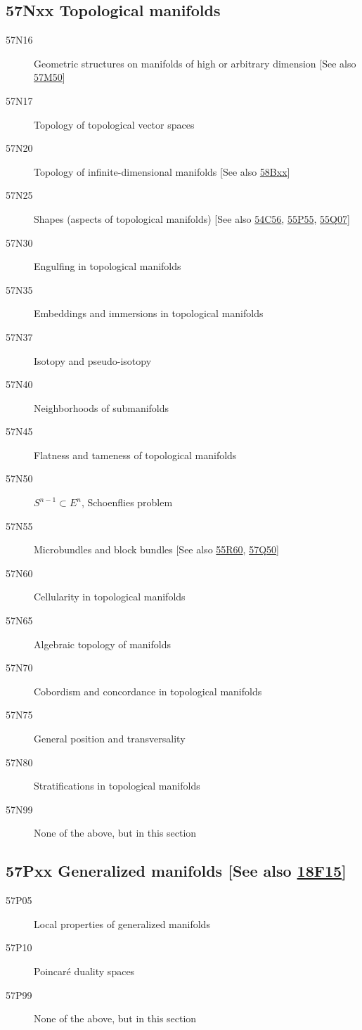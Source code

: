 \documentclass[letterpaper]{article}
\begin{document}
\subsection*{57Nxx  Topological manifolds }\label{57Nxx}
\begin{description} 
\item [57N16]\label{57N16} Geometric structures on manifolds of high or arbitrary dimension [See also \hyperref[57M50]{57M50}]
\item [57N17]\label{57N17} Topology of topological vector spaces
\item [57N20]\label{57N20} Topology of infinite-dimensional manifolds [See also \hyperref[58Bxx]{58Bxx}]
\item [57N25]\label{57N25} Shapes (aspects of topological manifolds) [See also \hyperref[54C56]{54C56}, \hyperref[55P55]{55P55}, \hyperref[55Q07]{55Q07}]
\item [57N30]\label{57N30} Engulfing in topological manifolds
\item [57N35]\label{57N35} Embeddings and immersions in topological manifolds
\item [57N37]\label{57N37} Isotopy and pseudo-isotopy
\item [57N40]\label{57N40} Neighborhoods of submanifolds
\item [57N45]\label{57N45} Flatness and tameness of topological manifolds
\item [57N50]\label{57N50} $S^{n-1}\subset E^n$, Schoenflies problem
\item [57N55]\label{57N55} Microbundles and block bundles [See also \hyperref[55R60]{55R60}, \hyperref[57Q50]{57Q50}]
\item [57N60]\label{57N60} Cellularity in topological manifolds
\item [57N65]\label{57N65} Algebraic topology of manifolds
\item [57N70]\label{57N70} Cobordism and concordance in topological manifolds
\item [57N75]\label{57N75} General position and transversality
\item [57N80]\label{57N80} Stratifications in topological manifolds
\item [57N99]\label{57N99} None of the above, but in this section
\end{description}
\subsection*{57Pxx  Generalized manifolds [See also \hyperref[18F15]{18F15}] }\label{57Pxx}
\begin{description}  
\item [57P05]\label{57P05} Local properties of generalized manifolds
\item [57P10]\label{57P10} Poincar\'{e} duality spaces
\item [57P99]\label{57P99} None of the above, but in this section
\end{description}
\end{document}
